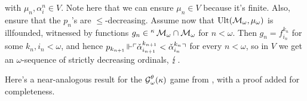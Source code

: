 \documentclass[../../main]{subfiles}
\begin{document}
{  with $\mu_n,\alpha_i^n\in V$. Note here that we can ensure $\mu_n\in V$ because it's finite. Also, ensure that the $p_n$'s are $\leq$-decreasing. Assume now that $\operatorname{Ult}(\operatorname{\mathcal M}_\omega,\mu_\omega)$ is illfounded, witnessed by functions $g_n\in{^\kappa\operatorname{\mathcal M}_\omega}\cap\operatorname{\mathcal M}_\omega$ for $n<\omega$. Then $g_n=f_{i_n}^{k_n}$ for some $k_n,i_n<\omega$, and hence $p_{k_{n+1}}\operatorname{\Vdash}\ulcorner \check\alpha_{i_{n+1}}^{k_{n+1}}<\check\alpha_{i_n}^{k_n} \urcorner$ for every $n<\omega$, so in $V$ we get an $\omega$-sequence of strictly decreasing ordinals, $\operatorname{\lightning}$.
}

Here's a near-analogous result for the $\operatorname{\mathcal G}^\theta_\omega(\kappa)$ game from \cite{NielsenWelch}, with a proof added for completeness.

\end{document}
